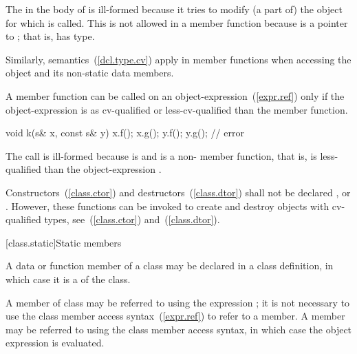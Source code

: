 The  in the body of  is ill-formed because it
tries to modify (a part of) the object for which  is
called. This is not allowed in a  member function because
 is a pointer to ; that is,  has
 type.
\exitexample

\pnum
Similarly,  semantics~(\ref{dcl.type.cv}) apply in
 member functions when accessing the object and its
non-static data members.

\pnum
A  member function can be called on an
object-expression~(\ref{expr.ref}) only if the object-expression is as
cv-qualified or less-cv-qualified than the member function.
\enterexample

\begin{codeblock}
void k(s& x, const s& y) {
  x.f();
  x.g();
  y.f();
  y.g();                        // error
}
\end{codeblock}

The call  is ill-formed because  is 
and  is a non- member function, that is,
 is less-qualified than the object-expression .
\exitexample

\pnum
{}%
%
%
%
Constructors~(\ref{class.ctor}) and destructors~(\ref{class.dtor}) shall
not be declared ,  or 
. \enternote However, these functions can be invoked to
create and destroy objects with cv-qualified types,
see~(\ref{class.ctor}) and~(\ref{class.dtor}).
\exitnote

[class.static]{Static members}%
%
%

\pnum
A data or function member of a class may be declared  in a
class definition, in which case it is a  of the class.

\pnum
A  member  of class  may be referred to
using the  expression ; it is not
necessary to use the class member access syntax~(\ref{expr.ref}) to
refer to a  member. A  member may be
referred to using the class member access syntax, in which case the
object expression is evaluated.
\enterexample

